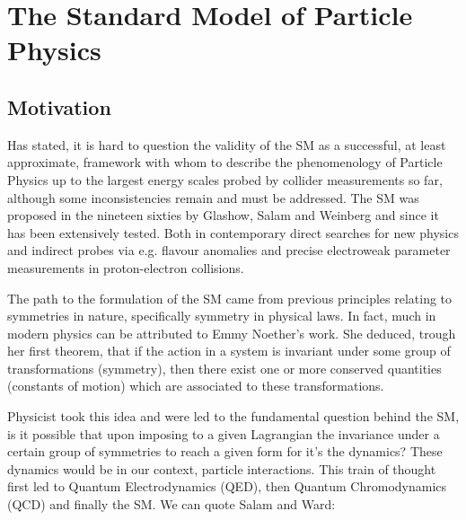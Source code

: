 
\chapter{The Standard Model of Particle Physics}
%
%
\section{Motivation}


Has stated, it is hard to question the validity of the SM as a successful, at least approximate, framework with whom to describe the phenomenology of Particle Physics up to the largest energy scales probed by collider measurements so far, although some inconsistencies remain and must be addressed.  
%
The SM was proposed in the nineteen sixties by Glashow, Salam and Weinberg and since it has been extensively tested. Both in contemporary direct searches for new physics and indirect probes via e.g. flavour anomalies and precise electroweak parameter measurements in proton-electron collisions. %

The path to the formulation of the SM came from previous principles relating to symmetries in nature, specifically symmetry in physical laws. 
%
In fact, much in modern physics can be attributed to Emmy Noether's work. She deduced, trough her first theorem, that if the action in a system is invariant under some group of transformations (symmetry), then there exist one or more conserved quantities (constants of motion) which are associated to these transformations. 

Physicist took this idea and were led to the fundamental question behind the SM, is it possible that upon imposing to a given Lagrangian the invariance under a certain group of symmetries to reach a given form for it's the dynamics? 
%
These dynamics would be in our context, particle interactions. This train of thought first led to Quantum Electrodynamics (QED), then Quantum Chromodynamics (QCD) and finally the SM. 
%
We can quote Salam and Ward: %

